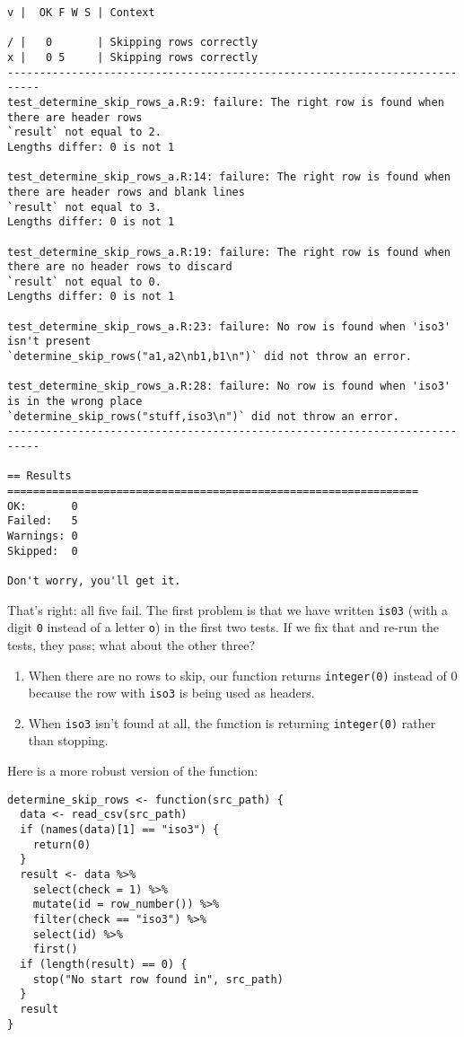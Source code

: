 \begin{lstlisting}
v |  OK F W S | Context

/ |   0       | Skipping rows correctly
x |   0 5     | Skipping rows correctly
---------------------------------------------------------------------------
test_determine_skip_rows_a.R:9: failure: The right row is found when there are header rows
`result` not equal to 2.
Lengths differ: 0 is not 1

test_determine_skip_rows_a.R:14: failure: The right row is found when there are header rows and blank lines
`result` not equal to 3.
Lengths differ: 0 is not 1

test_determine_skip_rows_a.R:19: failure: The right row is found when there are no header rows to discard
`result` not equal to 0.
Lengths differ: 0 is not 1

test_determine_skip_rows_a.R:23: failure: No row is found when 'iso3' isn't present
`determine_skip_rows("a1,a2\nb1,b1\n")` did not throw an error.

test_determine_skip_rows_a.R:28: failure: No row is found when 'iso3' is in the wrong place
`determine_skip_rows("stuff,iso3\n")` did not throw an error.
---------------------------------------------------------------------------

== Results ================================================================
OK:       0
Failed:   5
Warnings: 0
Skipped:  0

Don't worry, you'll get it.
\end{lstlisting}

That's right: all five fail.
The first problem is that we have written \texttt{is03}
(with a digit \texttt{0} instead of a letter \texttt{o})
in the first two tests.
If we fix that and re-run the tests, they pass;
what about the other three?

\begin{enumerate}
\item
  When there are no rows to skip, our function returns \texttt{integer(0)} instead of 0
  because the row with \texttt{iso3} is being used as headers.
\item
  When \texttt{iso3} isn't found at all, the function is returning \texttt{integer(0)} rather than stopping.
\end{enumerate}

\noindent
Here is a more robust version of the function:

\begin{lstlisting}
determine_skip_rows <- function(src_path) {
  data <- read_csv(src_path)
  if (names(data)[1] == "iso3") {
    return(0)
  }
  result <- data %>%
    select(check = 1) %>%
    mutate(id = row_number()) %>%
    filter(check == "iso3") %>%
    select(id) %>%
    first()
  if (length(result) == 0) {
    stop("No start row found in", src_path)
  }
  result
}
\end{lstlisting}

